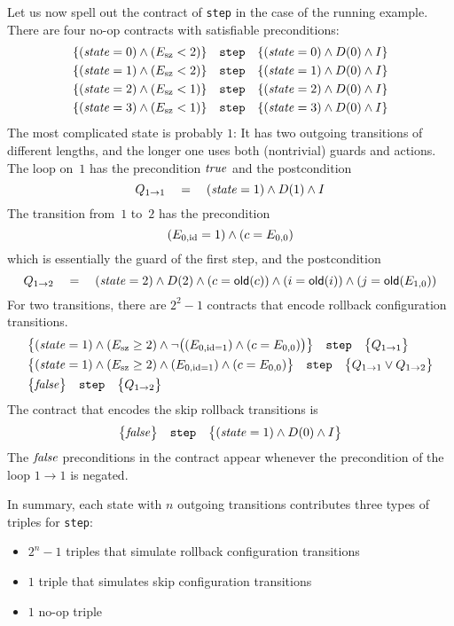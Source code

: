 \documentclass{article} %
\newcommand{\3}[3]{\{\,#1\,\}\;#2\;\{\,#3\,\}}
\begin{document}
Let us now spell out the contract of {\tt step} in the case of the running example.
There are four no-op contracts with satisfiable preconditions:
\begin{align*}
\{({\it state}=0)\land(E_{\rm sz}<2)\} \quad\text{\tt step}\quad
  \{({\it state}=0)\land D(0)\land I\} \\
\{({\it state}=1)\land(E_{\rm sz}<2)\} \quad\text{\tt step}\quad
  \{({\it state}=1)\land D(0)\land I\} \\
\{({\it state}=2)\land(E_{\rm sz}<1)\} \quad\text{\tt step}\quad
  \{({\it state}=2)\land D(0)\land I\} \\
\{({\it state}=3)\land(E_{\rm sz}<1)\} \quad\text{\tt step}\quad
  \{({\it state}=3)\land D(0)\land I\}
\end{align*}
The most complicated state is probably $1$:
It has two outgoing transitions of different lengths, and the longer one uses both (nontrivial) guards and actions.
The loop on~$1$ has the precondition ${\it true}$ and the postcondition
\[ Q_{1\to1} \quad=\quad ({\it state}=1) \land D(1) \land I \]
The transition from~$1$ to~$2$ has the precondition
\[ (E_{0,{\rm id}}=1)\land(c=E_{0,0}) \]
which is essentially the guard of the first step, and the postcondition
\[ Q_{1\to2} \quad=\quad
({\it state}=2)\land D(2)\land (c={\sf old}(c))\land (i={\sf old}(i))
  \land (j={\sf old}(E_{1,0}))\]
For two transitions, there are $2^2-1$ contracts that encode rollback configuration transitions.
\begin{align*}
&\bigl\{({\it state}=1)\land(E_{\rm sz}\ge2)\land
  \lnot\bigl((E_{0,{\rm id}=1})\land(c=E_{0,0})\bigr)\bigr\}
  \quad\text{\tt step}\quad
  \bigl\{Q_{1\to1}\bigr\} \\
&\bigl\{({\it state}=1)\land(E_{\rm sz}\ge2)\land
  (E_{0,{\rm id}=1})\land(c=E_{0,0})\bigr\}
  \quad\text{\tt step}\quad
  \bigl\{Q_{1\to1}\lor Q_{1\to2}\bigr\} \\
&\bigl\{{\it false}\bigr\}\quad\text{\tt step}\quad\bigl\{Q_{1\to2}\bigr\}
\end{align*}
The contract that encodes the skip rollback transitions is
\[ \bigl\{{\it false}\bigr\}\quad\text{\tt step}\quad
  \bigl\{({\it state}=1)\land D(0)\land I\bigr\} \]
The ${\it false}$ preconditions in the contract appear whenever the precondition of the loop $1\to1$ is negated.

In summary, each state with $n$ outgoing transitions contributes three types of triples for {\tt step}:
\begin{itemize}
\item $2^n-1$ triples that simulate rollback configuration transitions
\item $1$ triple that simulates skip configuration transitions
\item $1$ no-op triple
\end{itemize}
\end{document}
